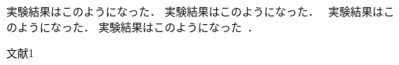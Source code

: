 
実験結果はこのようになった．\cite{1}
実験結果はこのようになった．~\cite{1}
実験結果はこのようになった\cite{1}．
実験結果はこのようになった~\cite{1}．
\begin{thebibliography}{1}
 文献1
\end{thebibliography}
